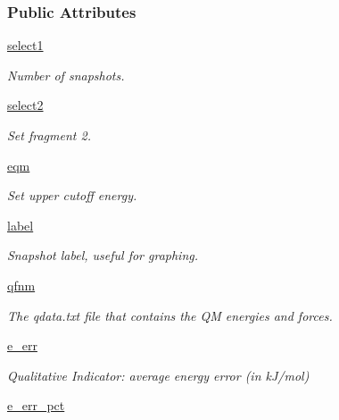 \subsubsection*{\-Public \-Attributes}
\begin{DoxyCompactItemize}
\item 
\hyperlink{classforcebalance_1_1interaction_1_1Interaction_ab39f595a8116711d03992a37776ec7e7}{select1}
\begin{DoxyCompactList}\small\item\em \-Number of snapshots. \end{DoxyCompactList}\item 
\hyperlink{classforcebalance_1_1interaction_1_1Interaction_a98d153938051d0290f3164f28305f160}{select2}
\begin{DoxyCompactList}\small\item\em \-Set fragment 2. \end{DoxyCompactList}\item 
\hyperlink{classforcebalance_1_1interaction_1_1Interaction_a6cac0fab72851f21a91fa5622918efc1}{eqm}
\begin{DoxyCompactList}\small\item\em \-Set upper cutoff energy. \end{DoxyCompactList}\item 
\hyperlink{classforcebalance_1_1interaction_1_1Interaction_ae2e0cc55eb17697784457ec9280c74f0}{label}
\begin{DoxyCompactList}\small\item\em \-Snapshot label, useful for graphing. \end{DoxyCompactList}\item 
\hyperlink{classforcebalance_1_1interaction_1_1Interaction_a713032004b5421d49ca87eadf7e2ad2e}{qfnm}
\begin{DoxyCompactList}\small\item\em \-The qdata.\-txt file that contains the \-Q\-M energies and forces. \end{DoxyCompactList}\item 
\hyperlink{classforcebalance_1_1interaction_1_1Interaction_a761d881eba96250a912eb1a4d18ae511}{e\-\_\-err}
\begin{DoxyCompactList}\small\item\em \-Qualitative \-Indicator\-: average energy error (in k\-J/mol) \end{DoxyCompactList}\item 
\hyperlink{classforcebalance_1_1interaction_1_1Interaction_a7422ae23c535b5f0b265997276cda48f}{e\-\_\-err\-\_\-pct}

\end{DoxyCompactItemize}
